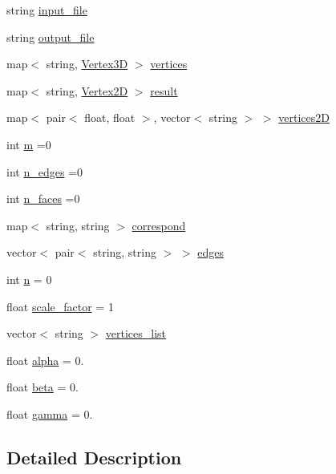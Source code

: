 \begin{DoxyCompactItemize}
\item 
string \hyperlink{class_three___to___two_acdd6380173d6df1ce3d72c911ba0f1af}{input\+\_\+file}
\item 
string \hyperlink{class_three___to___two_a94c401d2acc198ffb188d37e7ce424c4}{output\+\_\+file}
\item 
map$<$ string, \hyperlink{struct_vertex3_d}{Vertex3D} $>$ \hyperlink{class_three___to___two_a2550b425f64bae1a0f92f5405dab24b2}{vertices}
\item 
map$<$ string, \hyperlink{struct_vertex2_d}{Vertex2D} $>$ \hyperlink{class_three___to___two_a579ed77ab975e6cfb1cf90d28074a93b}{result}
\item 
map$<$ pair$<$ float, float $>$, vector$<$ string $>$ $>$ \hyperlink{class_three___to___two_a1116965a6138a9b16fee724eccff6ba5}{vertices2D}
\item 
int \hyperlink{class_three___to___two_a9e131241a48170afd8af54e30ee95ded}{m} =0
\item 
int \hyperlink{class_three___to___two_a42a8bb1919cbeaa1a717ecea05468493}{n\+\_\+edges} =0
\item 
int \hyperlink{class_three___to___two_aef5084fad08c5eeac58437d90113122f}{n\+\_\+faces} =0
\item 
map$<$ string, string $>$ \hyperlink{class_three___to___two_a98ab641ba7f2da5fffbe0066debcafaa}{correspond}
\item 
vector$<$ pair$<$ string, string $>$ $>$ \hyperlink{class_three___to___two_aafa5fc739b2313e58a440d9b8b3d4875}{edges}
\item 
int \hyperlink{class_three___to___two_a3893134e478349a3df093541bc35f406}{n} = 0
\item 
float \hyperlink{class_three___to___two_a6e2169c85306e089975e4be179ab8869}{scale\+\_\+factor} = 1
\item 
vector$<$ string $>$ \hyperlink{class_three___to___two_a08809b4ff50badda240d9adb8847405c}{vertices\+\_\+list}
\item 
float \hyperlink{class_three___to___two_a6a7cf88c8d654edd486bc979284c256a}{alpha} = 0.
\item 
float \hyperlink{class_three___to___two_a36bafd8c3cf8db0e6ea4f6f936922e3d}{beta} = 0.
\item 
float \hyperlink{class_three___to___two_aefe3e71b2a022c70407771625a5b416e}{gamma} = 0.
\end{DoxyCompactItemize}


\subsection{Detailed Description}


